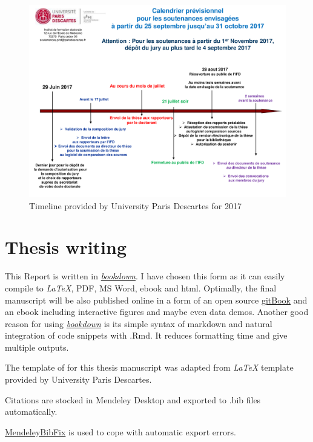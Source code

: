 \documentclass[12pt,]{book}
\theoremstyle{definition}
\theoremstyle{definition}
\theoremstyle{definition}
\theoremstyle{remark}
\begin{document}
\begin{figure}
\centering
\includegraphics{figures-ext/An-timeline.pdf}
\caption{Timeline provided by University Paris Descartes for 2017}
\end{figure}

\hypertarget{thesis-writing}{%
\section*{Thesis writing}\label{thesis-writing}}

This Report is written in
\href{https://github.com/rstudio/bookdown}{\emph{bookdown}}. I have
chosen this form as it can easily compile to \emph{LaTeX}, PDF, MS Word,
ebook and html. Optimally, the final manuscript will be also published
online in a form of an open source
\href{https://www.gitbook.com/about}{gitBook} and an ebook including
interactive figures and maybe even data demos. Another good reason for
using \href{https://github.com/rstudio/bookdown}{\emph{bookdown}} is its
simple syntax of markdown and natural integration of code snippets with
.Rmd. It reduces formatting time and give multiple outputs.

The template of for this thesis manuscript was adapted from \emph{LaTeX}
template provided by University Paris Descartes.

Citations are stocked in Mendeley Desktop and exported to .bib files
automatically.

\href{https://ramblingacademic.com/2016/06/fixing-bibtex-files-mendeley/}{MendeleyBibFix}
is used to cope with automatic export errors.
\end{document}
